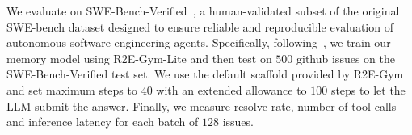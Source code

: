 We evaluate \model on SWE-Bench-Verified~\cite{jimenez2023swe}, a human-validated subset of the original SWE-bench dataset designed to ensure reliable and reproducible evaluation of autonomous software engineering agents. Specifically, following~\cite{jain2025r2e}, we train our memory model using R2E-Gym-Lite and then test on $500$ github issues on the SWE-Bench-Verified test set. We use the default scaffold provided by R2E-Gym and set maximum steps to $40$ with an extended allowance to $100$ steps to let the LLM submit the answer. Finally, we measure resolve rate, number of tool calls and inference latency for each batch of $128$ issues.